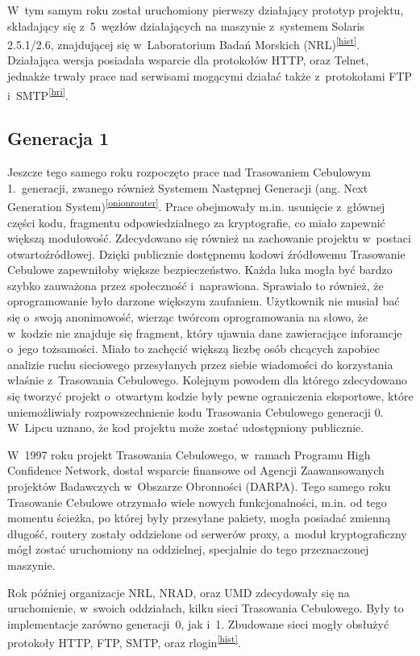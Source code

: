 W~tym samym roku został uruchomiony pierwszy działający prototyp projektu, składający się z~5~węzłów działających na maszynie z~systemem Solaris 2.5.1/2.6, znajdującej się w~Laboratorium Badań Morskich (NRL)\textsuperscript{\ref{hist}}. Działająca wersja posiadała wsparcie dla protokołów HTTP, oraz Telnet, jednakże trwały prace nad serwisami mogącymi działać także z~protokołami FTP i~SMTP\textsuperscript{\ref{hri}}.

\subsection{Generacja 1}
Jeszcze tego samego roku rozpoczęto prace nad Trasowaniem Cebulowym 1.~generacji, zwanego również Systemem Następnej Generacji (ang. Next Generation System)\textsuperscript{\ref{onionrouter}}. Prace obejmowały m.in. usunięcie z~głównej części kodu, fragmentu odpowiedzialnego za kryptografie, co miało zapewnić większą modułowość. Zdecydowano się również na zachowanie projektu w~postaci otwartoźródłowej. Dzięki publicznie dostępnemu kodowi źródłowemu Trasowanie Cebulowe zapewniłoby większe bezpieczeństwo. Każda luka mogła być bardzo szybko zauważona przez społeczność i~naprawiona. Sprawiało to również, że oprogramowanie było darzone większym zaufaniem. Użytkownik nie musiał bać się o~swoją anonimowość, wierząc twórcom oprogramowania na słowo, że w~kodzie nie znajduje się fragment, który ujawnia dane zawieracjące inforamcje o~jego tożsamości. Miało to zachęcić większą liczbę osób chcących zapobiec analizie ruchu sieciowego przesyłanych przez siebie wiadomości do korzystania właśnie z~Trasowania Cebulowego. Kolejnym powodem dla którego zdecydowano się tworzyć projekt o~otwartym kodzie były pewne ograniczenia eksportowe, które uniemożliwiały rozpowszechnienie kodu Trasowania Cebulowego generacji 0. W~Lipcu uznano, że kod projektu może zostać udostępniony publicznie.

W~1997 roku projekt Trasowania Cebulowego,  w~ramach Programu High Confidence Network, dostał wsparcie finansowe od Agencji Zaawansowanych projektów Badawczych w~Obszarze Obronności (DARPA). Tego samego roku Trasowanie Cebulowe otrzymało wiele nowych funkcjonalności, m.in. od tego momentu ścieżka, po której były przesyłane pakiety, mogła posiadać zmienną długość, routery zostały oddzielone od serwerów proxy, a~moduł kryptograficzny mógł zostać uruchomiony na oddzielnej, specjalnie do tego przeznaczonej maszynie. 

Rok później organizacje NRL, NRAD, oraz UMD zdecydowały się na uruchomienie, w~swoich oddziałach, kilku sieci Trasowania Cebulowego. Były to implementacje zarówno generacji~0, jak i~1. Zbudowane sieci mogły obsłużyć protokoły HTTP, FTP, SMTP, oraz rlogin\textsuperscript{\ref{hist}}. 

